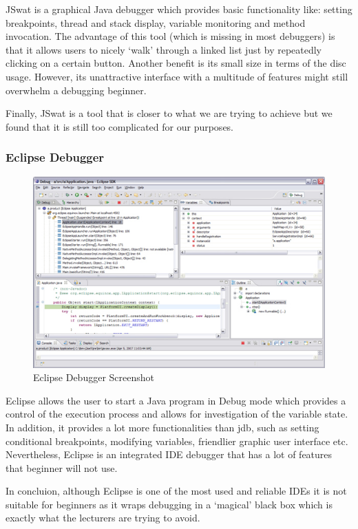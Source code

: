 \documentclass[11pt, a4paper]{article}
\begin{document}
JSwat is a graphical Java debugger which provides basic functionality like: setting breakpoints, thread and stack display, variable monitoring and method invocation.
The advantage of this tool (which is missing in most debuggers) is that it allows users to nicely `walk' through a linked list just by repeatedly clicking on a certain button.
Another benefit is its small size in terms of the disc usage.
However, its unattractive interface with a multitude of features might still overwhelm a debugging beginner.

Finally, JSwat is a tool that is closer to what we are trying to achieve but we found that it is still too complicated for our purposes.

\subsubsection{Eclipse Debugger}
\begin{figure}[h!]
\centering
\includegraphics[width=125mm]{eclipse.jpg}
\caption{Eclipse Debugger Screenshot}
\end{figure}

Eclipse allows the user to start a Java program in Debug mode which provides a control of the execution process and allows for investigation of the variable state.
In addition, it provides a lot more functionalities than jdb, such as setting conditional breakpoints, modifying variables, friendlier graphic user interface etc.
Nevertheless, Eclipse is an integrated IDE debugger that has a lot of features that beginner will not use.

In concluion, although Eclipse is one of the most used and reliable IDEs it is not suitable for beginners as it wraps debugging in a `magical' black box which is exactly what the lecturers are trying to avoid.
\end{document}
